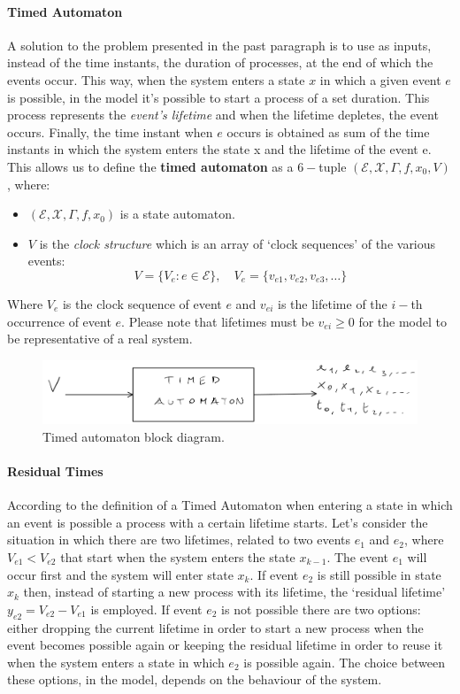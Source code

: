 \documentclass[12pt,a4paper]{article}
\begin{document}
\paragraph{Timed Automaton}
A solution to the problem presented in the past paragraph is to use as inputs, instead of the time instants, the duration of processes, at the end of which the events occur. This way, when the system enters a state $x$ in which a given event $e$ is possible, in the model it’s possible to start a process of a set duration. This process represents the \textit{event's lifetime} and when the lifetime depletes, the event occurs. Finally, the time instant when $e$ occurs is obtained as sum of the time instants in which the system enters the state x and the lifetime of the event e.
This allows us to define the \textbf{timed automaton} as a $6-$tuple $(\mathcal{E},\mathcal{X},\Gamma,f,x_0,V)$, where: 
\begin{itemize}
\item $(\mathcal{E},\mathcal{X},\Gamma,f,x_0)$ is a state automaton. 
\item $V$ is the \textit{clock structure} which is an array of `clock sequences’ of the various events:
$$
V=\{V_e : e\in\mathcal{E}\}, \quad V_e=\{v_{e1}, v_{e2}, v_{e3},\dots\}
$$
\end{itemize}	
\noindent
Where $V_e$ is the clock sequence of event $e$ and $v_{ei}$ is the lifetime of the $i-$th occurrence of event $e$. Please note that lifetimes must be $v_{ei} \ge 0$ for the model to be representative of a real system.

\begin{figure}[H]
	\centering
	\includegraphics[width=\textwidth]{IMG/timedAut.png}
	\caption{Timed automaton block diagram.}
	\label{fig:timedAut}
\end{figure}

\paragraph{Residual Times} According to the definition of a Timed Automaton when entering a state in which an event is possible a process with a certain lifetime starts. Let’s consider the situation in which there are two lifetimes, related to two events $e_1$ and $e_2$, where $V_{e1}<V_{e2}$ that start when the system enters the state $x_{k-1}$. The event $e_1$ will occur first and the system will enter state $x_k$. If event $e_2$ is still possible in state $x_k$ then, instead of starting a new process with its lifetime, the `residual lifetime’ $y_{e2}=V_{e2}-V_{e1}$ is employed. If event $e_2$ is not possible there are two options: either dropping the current lifetime in order to start a new process when the event becomes possible again or keeping the residual lifetime in order to reuse it when the system enters a state in which $e_2$ is possible again. The choice between these options, in the model, depends on the behaviour of the system.
\end{document}

